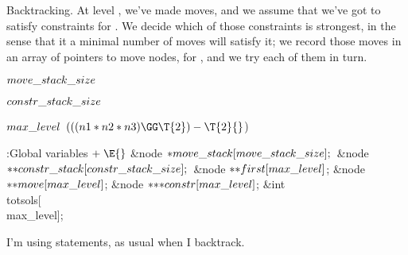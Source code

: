 Backtracking. At level , we've made  moves, and we
assume that
we've got to satisfy constraints  for . We decide which
of those constraints is strongest, in the sense that it a minimal number
of moves will satisfy it; we record those moves in an array of pointers
 to move nodes, for , and we try
each of them in turn.

\Y\B\4\D$\\{move\_stack\_size}$ \5
\par
\B\4\D$\\{constr\_stack\_size}$ \5
\par
\B\4\D$\\{max\_level}$ \5
$(((\\{n1}*\\{n2}*\\{n3})\GG\T{2})-\T{2}{}$)\par
\Y\B\4:Global variables\X${}\mathrel+\E{}$\6
\&{node} ${}{*}\\{move\_stack}[\\{move\_stack\_size}];{}$\6
\&{node} ${}{*}{*}\\{constr\_stack}[\\{constr\_stack\_size}];{}$\6
\&{node} ${}{*}{*}\\{first}[\\{max\_level}]{}$;\6
\&{node} ${}{*}{*}\\{move}[\\{max\_level}]{}$;%
\6
\&{node} ${}{*}{*}{*}\\{constr}[\\{max\_level}]{}$;\6
\&{int} \\{totsols}[\\{max\_level}];\par
\fi

I'm using  statements, as usual when I backtrack.


